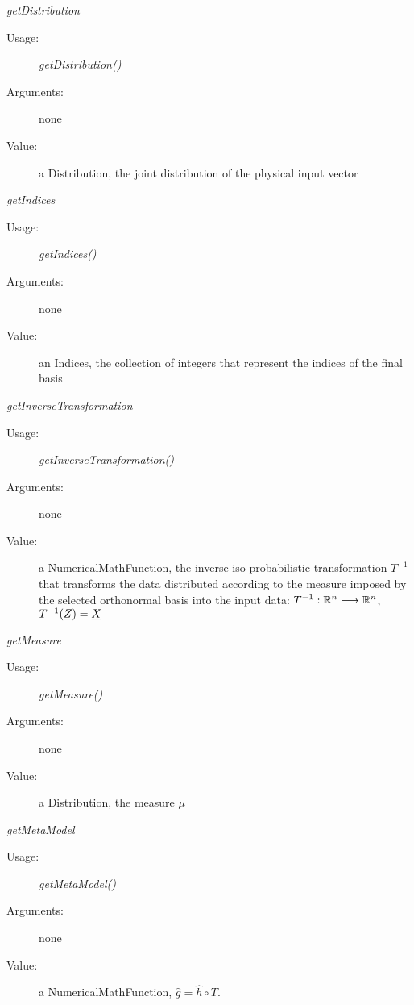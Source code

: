 \begin{description}
\begin{description}
\item \textit{getDistribution}
\begin{description}
\item[Usage:] \textit{getDistribution()}
\item[Arguments:] none
\item[Value:] a Distribution, the joint distribution of the physical input vector
\end{description}
\bigskip

\item \textit{getIndices}
\begin{description}
\item[Usage:] \textit{getIndices()}
\item[Arguments:] none
\item[Value:] an Indices, the collection of integers that represent the indices of the final basis
\end{description}
\bigskip


\item \textit{getInverseTransformation}
\begin{description}
\item[Usage:] \textit{getInverseTransformation()}
\item[Arguments:] none
\item[Value:] a NumericalMathFunction, the inverse iso-probabilistic transformation $T^{-1}$ that transforms the data distributed according to the measure imposed by the selected orthonormal basis into the input data: $T^{-1}: {\mathbb R}^n \longrightarrow{\mathbb R}^n $, $T^{-1}({\underline{Z}}) = {\underline{X}}$
\end{description}
\bigskip

\item \textit{getMeasure}
\begin{description}
\item[Usage:] \textit{getMeasure()}
\item[Arguments:] none
\item[Value:] a Distribution, the measure $\mu$
\end{description}
\bigskip

\item \textit{getMetaModel}
\begin{description}
\item[Usage:] \textit{getMetaModel()}
\item[Arguments:] none
\item[Value:] a NumericalMathFunction,  $\hat{g}  = \hat{h} \circ T$.
\end{description}
\bigskip


\end{description}
\end{description}
